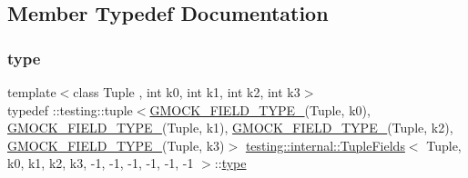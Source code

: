 \subsection{Member Typedef Documentation}
\mbox{\label{classtesting_1_1internal_1_1TupleFields_3_01Tuple_00_01k0_00_01k1_00_01k2_00_01k3_00_01-1_00_01-5ce285d726b58f03354f318c4712939e_a543de8075300fc9ee1b9f3494d492fb5}} 
\subsubsection{\texorpdfstring{type}{type}}
{\footnotesize\ttfamily template$<$class Tuple , int k0, int k1, int k2, int k3$>$ \\
typedef \+::testing\+::tuple$<$\mbox{\hyperlink{gmock-generated-matchers_8h_acf3e27de83a73f0d873da1cd471e505b}{G\+M\+O\+C\+K\+\_\+\+F\+I\+E\+L\+D\+\_\+\+T\+Y\+P\+E\+\_\+}}(Tuple, k0), \mbox{\hyperlink{gmock-generated-matchers_8h_acf3e27de83a73f0d873da1cd471e505b}{G\+M\+O\+C\+K\+\_\+\+F\+I\+E\+L\+D\+\_\+\+T\+Y\+P\+E\+\_\+}}(Tuple, k1), \mbox{\hyperlink{gmock-generated-matchers_8h_acf3e27de83a73f0d873da1cd471e505b}{G\+M\+O\+C\+K\+\_\+\+F\+I\+E\+L\+D\+\_\+\+T\+Y\+P\+E\+\_\+}}(Tuple, k2), \mbox{\hyperlink{gmock-generated-matchers_8h_acf3e27de83a73f0d873da1cd471e505b}{G\+M\+O\+C\+K\+\_\+\+F\+I\+E\+L\+D\+\_\+\+T\+Y\+P\+E\+\_\+}}(Tuple, k3)$>$ \mbox{\hyperlink{classtesting_1_1internal_1_1TupleFields}{testing\+::internal\+::\+Tuple\+Fields}}$<$ Tuple, k0, k1, k2, k3, -\/1, -\/1, -\/1, -\/1, -\/1, -\/1 $>$\+::\mbox{\hyperlink{classtesting_1_1internal_1_1TupleFields_3_01Tuple_00_01k0_00_01k1_00_01k2_00_01k3_00_01-1_00_01-5ce285d726b58f03354f318c4712939e_a543de8075300fc9ee1b9f3494d492fb5}{type}}}



